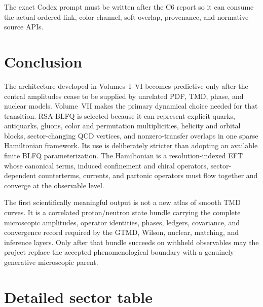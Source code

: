 \documentclass[11pt]{article}
\begin{document}
The exact Codex prompt must be written after the C6 report so it can consume the
actual ordered-link, color-channel, soft-overlap, provenance, and normative
source APIs.

\section{Conclusion}
\label{sec:conclusion}

The architecture developed in Volumes~I--VI becomes predictive only after the
central amplitudes cease to be supplied by unrelated PDF, TMD, phase, and
nuclear models.  Volume~VII makes the primary dynamical choice needed for that
transition.  RSA-BLFQ is selected because it can represent explicit quarks,
antiquarks, gluons, color and permutation multiplicities, helicity and orbital
blocks, sector-changing QCD vertices, and nonzero-transfer overlaps in one
sparse Hamiltonian framework.  Its use is deliberately stricter than adopting
an available finite BLFQ parameterization.  The Hamiltonian is a
resolution-indexed EFT whose canonical terms, induced confinement and chiral
operators, sector-dependent counterterms, currents, and partonic operators
must flow together and converge at the observable level.

The first scientifically meaningful output is not a new atlas of smooth TMD
curves.  It is a correlated proton/neutron state bundle carrying the complete
microscopic amplitudes, operator identities, phases, ledgers, covariance, and
convergence record required by the GTMD, Wilson, nuclear, matching, and
inference layers.  Only after that bundle succeeds on withheld observables may
the project replace the accepted phenomenological boundary with a genuinely
generative microscopic parent.

\appendix

\section{Detailed sector table}
\label{app:sectors}
\end{document}
